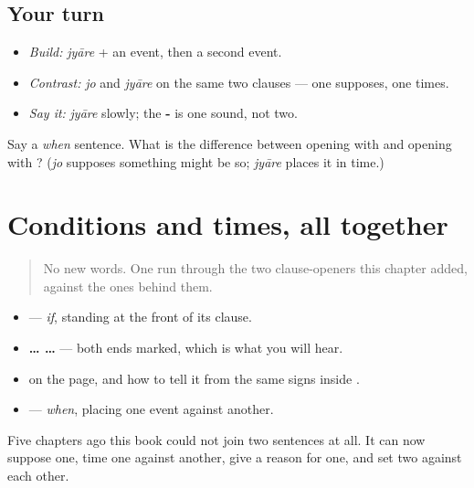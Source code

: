 \subsection*{Your turn}
\begin{itemize}
\raggedright
  \item \emph{Build:} \emph{jyāre} + an event, then a second event.
  \item \emph{Contrast:} \emph{jo} and \emph{jyāre} on the same two clauses — one supposes, one times.
  \item \emph{Say it:} \emph{jyāre} slowly; the \textbf{-} is one sound, not two.
\end{itemize}

\begin{tcolorbox}[breakable,colback=teal!4,colframe=teal!35!black,title={Before you move on}]
Say a \emph{when} sentence. What is the difference between opening with \textbf{} and opening with \textbf{}? (\emph{jo} supposes something might be so; \emph{jyāre} places it in time.)
\end{tcolorbox}
\section[Practice]{Conditions and times, all together}

\label{lesson:GU-C35-condition-checkpoint}



\begin{quote}
No new words. One run through the two clause-openers this chapter added, against the ones behind them.
\end{quote}

\begin{grammarlens}[title={What you've built}]
\begin{itemize}
\raggedright
  \item \textbf{} — \emph{if}, standing at the front of its clause.
  \item \textbf{ …  …} — both ends marked, which is what you will hear.
  \item \textbf{} on the page, and how to tell it from the same signs inside \textbf{}.
  \item \textbf{} — \emph{when}, placing one event against another.
\end{itemize}

Five chapters ago this book could not join two sentences at all. It can now suppose one, time one against another, give a reason for one, and set two against each other.
\end{grammarlens}


